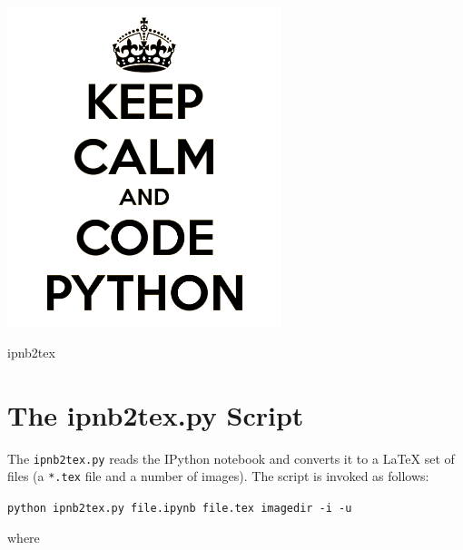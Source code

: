\documentclass[english]{workpackage}[1996/06/02]
\begin{document}
\WPlayout


\ 
\vspace{50mm}
\begin{center}
\includegraphics[width=0.6\textwidth]{./images/keep-calm-and-code-python_BW.png}
\end{center}
\vspace{5mm}
\begin{center}
{\LARGE  ipnb2tex}
\end{center}

\newpage

\tableofcontents
\listoffigures
\listoftables
\lstlistoflistings



\chapter{The ipnb2tex.py Script}
\label{sec:Theipnb2texpyScript}


The \verb+ipnb2tex.py+ reads the IPython notebook and converts it to a \LaTeX{} set of files (a \verb+*.tex+ file and a number of images).  The script is invoked as follows:


\verb+python ipnb2tex.py file.ipynb file.tex imagedir -i -u+


where
\end{document}
